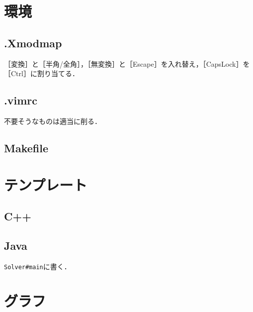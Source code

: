 \documentclass[landscape,twocolumn,9pt]{jsarticle}
\begin{document}
\setlength{\abovedisplayskip}{1mm}
\setlength{\belowdisplayskip}{1mm}

\rhead{\thepage}

\tableofcontents
\clearpage

\rhead{\thepage}

\section{環境}%
\subsection{.Xmodmap}
［変換］と［半角/全角］，［無変換］と［Escape］を入れ替え，［CapsLock］を［Ctrl］に割り当てる．


\subsection{.vimrc}
不要そうなものは適当に削る．


\subsection{Makefile}


\section{テンプレート}%
\subsection{C++}


\subsection{Java}
\texttt{Solver\#main}に書く．


\section{グラフ}%
\end{document}

